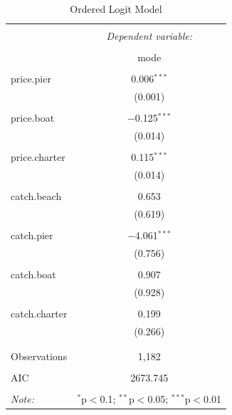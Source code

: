 \documentclass[12pt]{article}
\begin{document}
{%
\begin{table}[H] \centering 
  \caption{Ordered Logit Model} 
  \label{} 
\begin{tabular}{@{\extracolsep{5pt}}lc} 
\\[-1.8ex]\hline 
\hline \\[-1.8ex] 
 & \multicolumn{1}{c}{\textit{Dependent variable:}} \\ 
\cline{2-2} 
\\[-1.8ex] & mode \\ 
\hline \\[-1.8ex] 
 price.pier & 0.006$^{***}$ \\ 
  & (0.001) \\ 
  & \\ 
 price.boat & $-$0.125$^{***}$ \\ 
  & (0.014) \\ 
  & \\ 
 price.charter & 0.115$^{***}$ \\ 
  & (0.014) \\ 
  & \\ 
 catch.beach & 0.653 \\ 
  & (0.619) \\ 
  & \\ 
 catch.pier & $-$4.061$^{***}$ \\ 
  & (0.756) \\ 
  & \\ 
 catch.boat & 0.907 \\ 
  & (0.928) \\ 
  & \\ 
 catch.charter & 0.199 \\ 
  & (0.266) \\ 
  & \\ 
\hline \\[-1.8ex] 
Observations & 1,182 \\ 
\hline \\[-1.8ex] 
AIC & 2673.745 \\
\hline
\hline \\[-1.8ex] 
\textit{Note:}  & \multicolumn{1}{r}{$^{*}$p$<$0.1; $^{**}$p$<$0.05; $^{***}$p$<$0.01} \\ 
\end{tabular} 
\end{table} 

}
\end{document}
